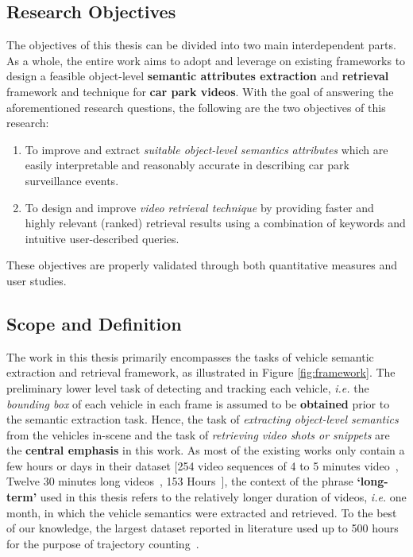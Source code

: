 \vspace{1em}
\subsection{Research Objectives}
The objectives of this thesis can be divided into two main interdependent parts. As a whole, the entire work aims to adopt and leverage on existing frameworks to design a feasible object-level \textbf{semantic attributes extraction} and \textbf{retrieval} framework and technique for \textbf{car park videos}.
With the goal of answering the aforementioned research questions, the following are the two objectives of this research:

\begin{enumerate}[start=1,label={(\bfseries O\arabic*):}]
  \item To improve and extract \textit{suitable object-level semantics attributes} which are easily interpretable and reasonably accurate in describing car park surveillance events.
  \item To design and improve \textit{video retrieval technique} by providing faster and highly relevant (ranked) retrieval results using a combination of keywords and intuitive user-described queries.
\end{enumerate}
\noindent These objectives are properly validated through both quantitative measures and user studies.

\vspace{1em}
\subsection{Scope and Definition}
\label{subsec:scope}
The work in this thesis primarily encompasses the tasks
of vehicle semantic extraction and retrieval framework, as illustrated in Figure \ref{fig:framework}. The preliminary lower level task of detecting and tracking each vehicle, \emph{i.e.} the \textit{bounding box} of each vehicle in each frame is assumed to be \textbf{obtained} prior to the semantic extraction task.
Hence, the task of \textit{extracting object-level semantics} from the vehicles in-scene and the task of \textit{retrieving video shots or snippets} are the \textbf{central emphasis} in this work.
As most of the existing works only contain a few hours or days in their dataset [254 video sequences of 4 to 5 minutes video~\cite{liu2016highway}, Twelve 30 minutes long videos~\cite{marmol2016quickspot}, 153 Hours~\cite{ren2018learning}], the context of the phrase \textbf{`long-term'} used in this thesis refers to the relatively longer duration of videos, \emph{i.e.} one month, in which the vehicle semantics were extracted and retrieved. To the best of our knowledge, the largest dataset reported in literature used up to 500 hours for the purpose of trajectory counting~\cite{lessard2016countingapp}.


